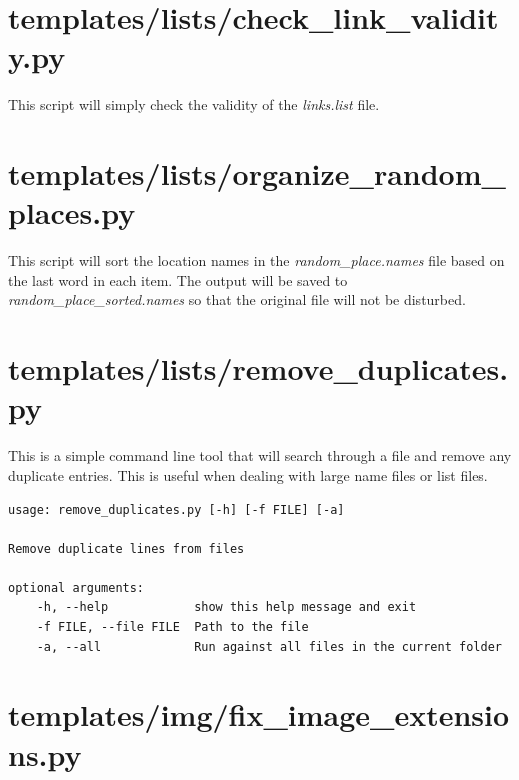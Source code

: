 \section{templates/lists/check\_link\_validity.py}


This script will simply check the validity of the \textit{links.list} file.












\section{templates/lists/organize\_random\_places.py}

This script will sort the location names in the \textit{random\_place.names} file based on the last word in each item. The output will be saved to \textit{random\_place\_sorted.names} so that the original file will not be disturbed.














\section{templates/lists/remove\_duplicates.py}

This is a simple command line tool that will search through a file and remove any duplicate entries. This is useful when dealing with large name files or list files.

\begin{lstlisting}
usage: remove_duplicates.py [-h] [-f FILE] [-a]

Remove duplicate lines from files

optional arguments:
	-h, --help            show this help message and exit
	-f FILE, --file FILE  Path to the file
	-a, --all             Run against all files in the current folder
\end{lstlisting}














\section{templates/img/fix\_image\_extensions.py}

